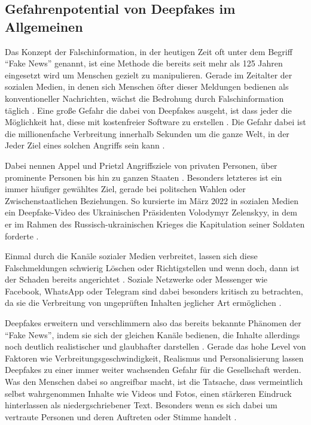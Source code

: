 \subsection{Gefahrenpotential von Deepfakes im Allgemeinen}\label{Gefahrenpotential}
Das Konzept der Falschinformation, in der heutigen Zeit oft unter dem Begriff ``Fake News'' genannt, ist eine Methode die bereits seit mehr als 125 Jahren eingesetzt wird um Menschen gezielt zu manipulieren.
Gerade im Zeitalter der sozialen Medien, in denen sich Menschen öfter dieser Meldungen bedienen als konventioneller Nachrichten, wächst die Bedrohung durch Falschinformation täglich \citep[][]{Lee2019}.
Eine große Gefahr die dabei von Deepfakes ausgeht, ist dass jeder die Möglichkeit hat, diese mit kostenfreier Software zu erstellen \citep[][]{Appel2022}.
Die Gefahr dabei ist die millionenfache Verbreitung innerhalb Sekunden um die ganze Welt, in der Jeder Ziel eines solchen Angriffs sein kann \citep[][]{Shahzad2022}.
\par
Dabei nennen Appel und Prietzl Angriffsziele von privaten Personen, über prominente Personen bis hin zu ganzen Staaten \citep[][]{Appel2022}.
Besonders letzteres ist ein immer häufiger gewähltes Ziel, gerade bei politschen Wahlen oder Zwischenstaatlichen Beziehungen.
So kursierte im März 2022 in sozialen Medien ein Deepfake-Video des Ukrainischen Präsidenten Volodymyr Zelenskyy, in dem er im Rahmen des Russisch-ukrainischen Krieges die Kapitulation seiner Soldaten forderte \citep[Vgl.][]{Holroyd2022}.
\par
Einmal durch die Kanäle sozialer Medien verbreitet, lassen sich diese Falschmeldungen schwierig Löschen oder Richtigstellen und wenn doch, dann ist der Schaden bereits angerichtet \citep[Vgl.][]{Shahzad2022}.
Soziale Netzwerke oder Messenger wie Facebook, WhatsApp oder Telegram sind dabei besonders kritisch zu betrachten, da sie die Verbreitung von ungeprüften Inhalten jeglicher Art ermöglichen \citep[][]{Appel2022}.
\par
Deepfakes erweitern und verschlimmern also das bereits bekannte Phänomen der ``Fake News'', indem sie sich der gleichen Kanäle bedienen, die Inhalte allerdings noch deutlich realistischer und glaubhafter darstellen \citep[][]{Appel2022}.
Gerade das hohe Level von Faktoren wie Verbreitungsgeschwindigkeit, Realismus und Personalisierung lassen Deepfakes zu einer immer weiter wachsenden Gefahr für die Gesellschaft werden.
Was den Menschen dabei so angreifbar macht, ist die Tatsache, dass vermeintlich selbst wahrgenommen Inhalte wie Videos und Fotos, einen stärkeren Eindruck hinterlassen als niedergschriebener Text.
Besonders wenn es sich dabei um vertraute Personen und deren Auftreten oder Stimme handelt \citep[][]{Kietzmann2020}.
\newpage